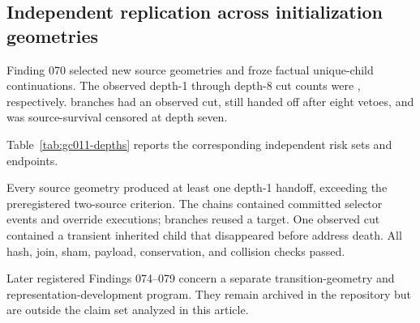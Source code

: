 \subsection{Independent replication across initialization geometries}

Finding 070 selected \GCElevenSources{} new source geometries and froze
\GCElevenInitial{} factual unique-child continuations. The observed depth-1
through depth-8 cut counts were \GCElevenDepthCounts{}, respectively.
\GCElevenCutTotal{} branches had an observed cut, \GCElevenAboveMax{} still
handed off after eight vetoes, and \GCElevenSourceCensored{} was
source-survival censored at depth seven.

Table~\ref{tab:gc011-depths} reports the corresponding independent risk sets and
endpoints.



Every source geometry produced at least one depth-1 handoff, exceeding the
preregistered two-source criterion. The chains contained
\GCElevenVetoEvents{} committed selector events and
\GCElevenOverrideExecutions{} override executions;
\GCElevenTargetReuseBranches{} branches reused a target. One observed cut
contained a transient inherited child that disappeared before address death.
All hash, join, sham, payload, conservation, and collision checks passed.

Later registered Findings 074--079 concern a separate transition-geometry and
representation-development program. They remain archived in the repository but
are outside the claim set analyzed in this article.
